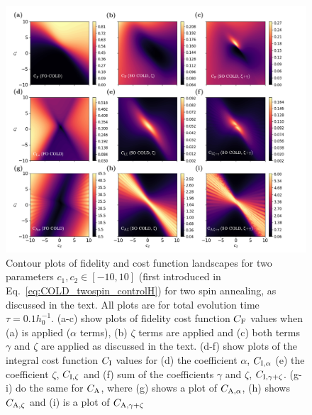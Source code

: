 \begin{figure}[t!]
    \centering
    \includegraphics[width=\linewidth]{images/two_spin_contours.png} \caption[Two-spin annealing contour plots for final state fidelity and AGP cost function values.]{Contour plots of fidelity and  cost function landscapes for two parameters $c_1, c_2 \in [-10, 10]$ (first introduced in Eq.~\eqref{eq:COLD_twospin_controlH}) for two spin annealing, as discussed in the text. All plots are for total evolution time $\tau = 0.1 h_0^{-1}$. (a-c) show plots of fidelity cost function $C_{\rm F}$ values when (a)   is applied ($\alpha$ terms), (b)   $\zeta$ terms are applied and (c) both   terms $\gamma$ and $\zeta$ are applied as discussed in the text. (d-f) show plots of the integral cost function $C_{\rm I}$ values for (d) the coefficient $\alpha$, $C_{\rm I, \alpha}$ (e) the coefficient $\zeta$, $C_{\rm I, \zeta}$ and (f) sum of the coefficients $\gamma$ and $\zeta$, $C_{\rm I, \gamma + \zeta}$. (g-i) do the same for $C_{\rm A}$, where (g) shows a plot of $C_{\rm A, \alpha}$, (h) shows $C_{\rm A, \zeta}$ and (i) is a plot of $C_{\rm A, \gamma + \zeta}$}\label{fig:two_spin_higher_order}
\end{figure}

